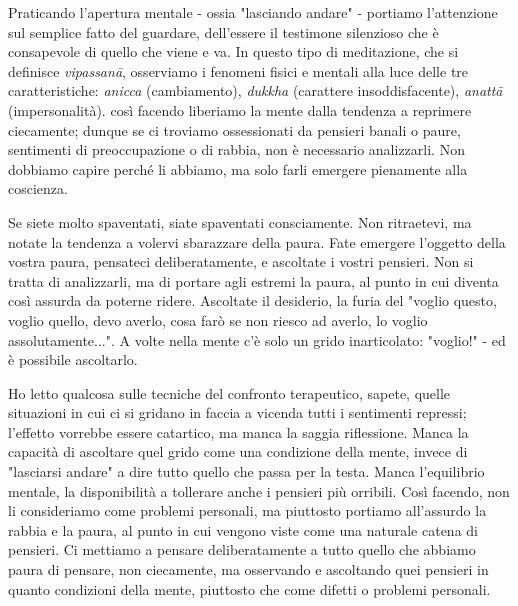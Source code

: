 
Praticando l'apertura mentale - ossia "lasciando andare" - portiamo
l'attenzione sul semplice fatto del guardare, dell'essere il testimone
silenzioso che è consapevole di quello che viene e va. In questo tipo di
meditazione, che si definisce \textit{vipassanā}, osserviamo i fenomeni fisici e
mentali alla luce delle tre caratteristiche: \textit{anicca} (cambiamento),
\textit{dukkha} (carattere insoddisfacente), \textit{anattā} (impersonalità). così facendo
liberiamo la mente dalla tendenza a reprimere ciecamente; dunque se ci
troviamo ossessionati da pensieri banali o paure, sentimenti di
preoccupazione o di rabbia, non è necessario analizzarli. Non dobbiamo
capire perché li abbiamo, ma solo farli emergere pienamente alla
coscienza.

Se siete molto spaventati, siate spaventati consciamente. Non
ritraetevi, ma notate la tendenza a volervi sbarazzare della paura. Fate
emergere l'oggetto della vostra paura, pensateci deliberatamente, e
ascoltate i vostri pensieri. Non si tratta di analizzarli, ma di portare
agli estremi la paura, al punto in cui diventa così assurda da poterne
ridere. Ascoltate il desiderio, la furia del "voglio questo, voglio
quello, devo averlo, cosa farò se non riesco ad averlo, lo voglio
assolutamente...". A volte nella mente c'è solo un grido inarticolato:
"voglio!" - ed è possibile ascoltarlo.

Ho letto qualcosa sulle tecniche del confronto terapeutico, sapete,
quelle situazioni in cui ci si gridano in faccia a vicenda tutti i
sentimenti repressi; l'effetto vorrebbe essere catartico, ma manca la
saggia riflessione. Manca la capacità di ascoltare quel grido come una
condizione della mente, invece di "lasciarsi andare" a dire tutto quello
che passa per la testa. Manca l'equilibrio mentale, la disponibilità a
tollerare anche i pensieri più orribili. Così facendo, non li
consideriamo come problemi personali, ma piuttosto portiamo all'assurdo
la rabbia e la paura, al punto in cui vengono viste come una naturale
catena di pensieri. Ci mettiamo a pensare deliberatamente a tutto quello
che abbiamo paura di pensare, non ciecamente, ma osservando e ascoltando
quei pensieri in quanto condizioni della mente, piuttosto che come
difetti o problemi personali.

